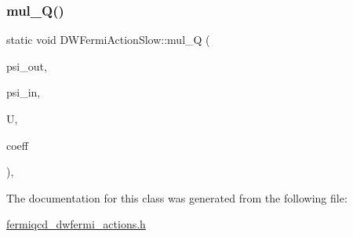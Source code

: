 \subsubsection{\texorpdfstring{mul\+\_\+\+Q()}{mul\_Q()}}
{\footnotesize\ttfamily static void D\+W\+Fermi\+Action\+Slow\+::mul\+\_\+Q (\begin{DoxyParamCaption}\item[{\hyperlink{classdwfermi__field}{dwfermi\+\_\+field} \&}]{psi\+\_\+out,  }\item[{\hyperlink{classdwfermi__field}{dwfermi\+\_\+field} \&}]{psi\+\_\+in,  }\item[{\hyperlink{classgauge__field}{gauge\+\_\+field} \&}]{U,  }\item[{\hyperlink{classcoefficients}{coefficients} \&}]{coeff }\end{DoxyParamCaption})\hspace{0.3cm}{\ttfamily [inline]}, {\ttfamily [static]}}



The documentation for this class was generated from the following file\+:\begin{DoxyCompactItemize}
\item 
\hyperlink{fermiqcd__dwfermi__actions_8h}{fermiqcd\+\_\+dwfermi\+\_\+actions.\+h}\end{DoxyCompactItemize}
